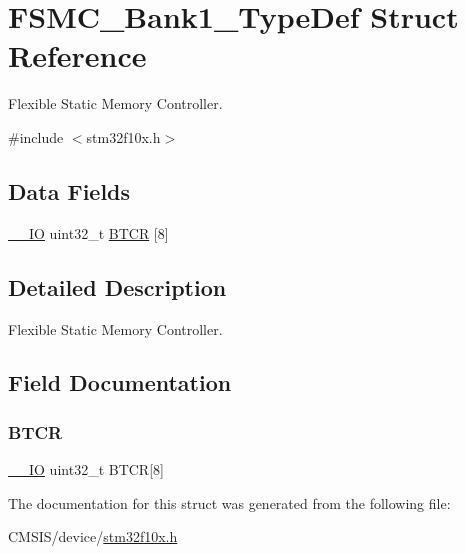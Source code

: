 \hypertarget{struct_f_s_m_c___bank1___type_def}{}\section{F\+S\+M\+C\+\_\+\+Bank1\+\_\+\+Type\+Def Struct Reference}
\label{struct_f_s_m_c___bank1___type_def}


Flexible Static Memory Controller.  




{\ttfamily \#include $<$stm32f10x.\+h$>$}

\subsection*{Data Fields}
\begin{DoxyCompactItemize}
\item 
\mbox{\hyperlink{core__sc300_8h_aec43007d9998a0a0e01faede4133d6be}{\+\_\+\+\_\+\+IO}} uint32\+\_\+t \mbox{\hyperlink{struct_f_s_m_c___bank1___type_def_a80a6708b507f6eecbc10424fdb088b79}{B\+T\+CR}} \mbox{[}8\mbox{]}
\end{DoxyCompactItemize}


\subsection{Detailed Description}
Flexible Static Memory Controller. 

\subsection{Field Documentation}
\mbox{\label{struct_f_s_m_c___bank1___type_def_a80a6708b507f6eecbc10424fdb088b79}} 
\subsubsection{\texorpdfstring{BTCR}{BTCR}}
{\footnotesize\ttfamily \mbox{\hyperlink{core__sc300_8h_aec43007d9998a0a0e01faede4133d6be}{\+\_\+\+\_\+\+IO}} uint32\+\_\+t B\+T\+CR\mbox{[}8\mbox{]}}



The documentation for this struct was generated from the following file\+:\begin{DoxyCompactItemize}
\item 
C\+M\+S\+I\+S/device/\mbox{\hyperlink{stm32f10x_8h}{stm32f10x.\+h}}\end{DoxyCompactItemize}
